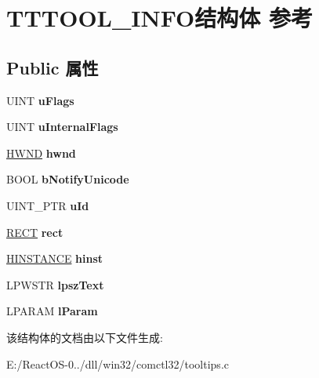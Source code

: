 \hypertarget{struct_t_t_t_o_o_l___i_n_f_o}{}\section{T\+T\+T\+O\+O\+L\+\_\+\+I\+N\+F\+O结构体 参考}
\label{struct_t_t_t_o_o_l___i_n_f_o}
\subsection*{Public 属性}
\begin{DoxyCompactItemize}
\item 
\mbox{\label{struct_t_t_t_o_o_l___i_n_f_o_a4e174cc50b202712f1395809160272d1}} 
U\+I\+NT {\bfseries u\+Flags}
\item 
\mbox{\label{struct_t_t_t_o_o_l___i_n_f_o_a5039b1a75a3fe15ce653f271f7f494d7}} 
U\+I\+NT {\bfseries u\+Internal\+Flags}
\item 
\mbox{\label{struct_t_t_t_o_o_l___i_n_f_o_ada1f7e7667527a7073c8ecc3b4171328}} 
\hyperlink{interfacevoid}{H\+W\+ND} {\bfseries hwnd}
\item 
\mbox{\label{struct_t_t_t_o_o_l___i_n_f_o_a52a206f1a0c9700576ec4bb399c0c2f5}} 
B\+O\+OL {\bfseries b\+Notify\+Unicode}
\item 
\mbox{\label{struct_t_t_t_o_o_l___i_n_f_o_a07872694ec8267ae471b6086cf983b7d}} 
U\+I\+N\+T\+\_\+\+P\+TR {\bfseries u\+Id}
\item 
\mbox{\label{struct_t_t_t_o_o_l___i_n_f_o_a62f73e11f593a86a2dc21ecb199b5343}} 
\hyperlink{structtag_r_e_c_t}{R\+E\+CT} {\bfseries rect}
\item 
\mbox{\label{struct_t_t_t_o_o_l___i_n_f_o_a5b7c1e3a066de6f3eea43cce91e7c740}} 
\hyperlink{interfacevoid}{H\+I\+N\+S\+T\+A\+N\+CE} {\bfseries hinst}
\item 
\mbox{\label{struct_t_t_t_o_o_l___i_n_f_o_a8c39d3a37c119f88d8a393d208a56cb6}} 
L\+P\+W\+S\+TR {\bfseries lpsz\+Text}
\item 
\mbox{\label{struct_t_t_t_o_o_l___i_n_f_o_a7fdd0191b3795f329cd88ec6e6f9791c}} 
L\+P\+A\+R\+AM {\bfseries l\+Param}
\end{DoxyCompactItemize}


该结构体的文档由以下文件生成\+:\begin{DoxyCompactItemize}
\item 
E\+:/\+React\+O\+S-\/0../dll/win32/comctl32/tooltips.\+c\end{DoxyCompactItemize}
